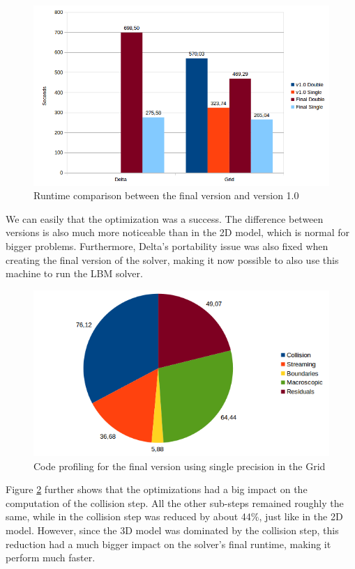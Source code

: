 \documentclass[12pt, openany]{book}
\begin{document}
  \begin{figure}[H]
  	\centering
  	\includegraphics[width=\linewidth]{Resources/Images/vfv3d.png}
  	\caption{Runtime comparison between the final version and version 1.0}
  	\label{fig:vfv3d}
  \end{figure}
  
  We can easily that the optimization was a success. The difference between versions is also much more noticeable than in the 2D model, which is normal for bigger problems. Furthermore, Delta's portability issue was also fixed when creating the final version of the solver, making it now possible to also use this machine to run the LBM solver.
  
    \begin{figure}[H]
    	\centering
    	\includegraphics[width=\linewidth]{Resources/Images/vfv3dprofile.png}
    	\caption{Code profiling for the final version using single precision in the Grid}
    	\label{fig:vfv3dprofile}
    \end{figure}
  
  Figure \ref{fig:vfv3dprofile} further shows that the optimizations had a big impact on the computation of the collision step. All the other sub-steps remained roughly the same, while in the collision step was reduced by about 44\%, just like in the 2D model. However, since the 3D model was dominated by the collision step, this reduction had a much bigger impact on the solver's final runtime, making it perform much faster. 
  
\end{document}
